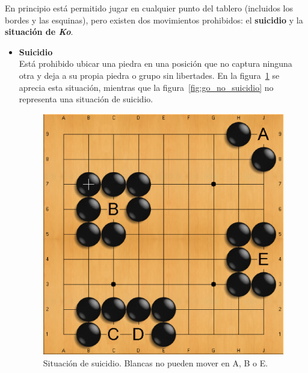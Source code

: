 En principio está permitido jugar en cualquier punto del tablero (incluidos los bordes y las esquinas), pero existen dos movimientos prohibidos: el \textbf{suicidio} y la \textbf{situación de \textit{Ko}}.
\begin{itemize}
	\item \textbf{Suicidio} \\
	Está prohibido ubicar una piedra en una posición que no captura ninguna otra y deja a su propia piedra o grupo sin libertades. En la figura~\ref{fig:go_suicidio} se aprecia esta situación, mientras que la figura~\ref{fig:go_no_suicidio} no representa una situación de suicidio.
\begin{figure}[t]
	\centering
	\begin{minipage}[t]{0.4\linewidth}
		\centering
		\includegraphics[scale=0.2]{contenido/cap2/imagenes/suicidio.eps}
		\caption[Situación de suicidio en el Go]{Situación de suicidio. Blancas no pueden mover en A, B o E.}
		\label{fig:go_suicidio}
	\end{minipage}
	\hspace{1cm}
	\begin{minipage}[t]{0.4\linewidth}
		\centering

\end{minipage}
\end{figure}
\end{itemize}
